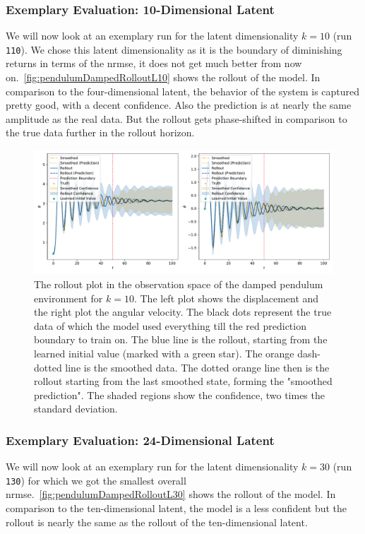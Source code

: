 		\subsubsection{Exemplary Evaluation: 10-Dimensional Latent}
			\label{subsubsec:pendulumDampedL10}

			We will now look at an exemplary run for the latent dimensionality \( k = 10 \) (run \texttt{110}). We chose this latent dimensionality as it is the boundary of diminishing returns in terms of the \ac{nrmse}, \ie it does not get much better from now on.~\autoref{fig:pendulumDampedRolloutL10} shows the rollout of the model. In comparison to the four-dimensional latent, the behavior of the system is captured pretty good, with a decent confidence. Also the prediction is at nearly the same amplitude as the real data. But the rollout gets phase-shifted in comparison to the true data further in the rollout horizon.

			\begin{figure}
				\centering
				\includegraphics[width=\linewidth]{figures/results/pendulum-damped/run-latent-dim-10/rollout-observations-N0.pdf}
				\caption[Rollout of the damped pendulum experiment for 10 latent dimensions]{The rollout plot in the observation space of the damped pendulum environment for \(k = 10\). The left plot shows the displacement and the right plot the angular velocity. The black dots represent the true data of which the model used everything till the red prediction boundary to train on. The blue line is the rollout, starting from the learned initial value (marked with a green star). The orange dash-dotted line is the smoothed data. The dotted orange line then is the rollout starting from the last smoothed state, forming the "smoothed prediction". The shaded regions show the confidence, \ie two times the standard deviation.}
				\label{fig:pendulumDampedRolloutL10}
			\end{figure}

		\subsubsection{Exemplary Evaluation: 24-Dimensional Latent}
			We will now look at an exemplary run for the latent dimensionality \( k = 30 \) (run \texttt{130}) for which we got the smallest overall \ac{nrmse}.~\autoref{fig:pendulumDampedRolloutL30} shows the rollout of the model. In comparison to the ten-dimensional latent, the model is a less confident but the rollout is nearly the same as the rollout of the ten-dimensional latent.

